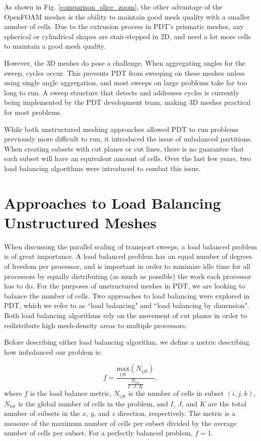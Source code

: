 \documentclass[11pt, letterpaper,titlepage,oneside]{article}
\begin{document}
As shown in Fig. \ref{comparison_slice_zoom}, the other advantage of the OpenFOAM meshes is the ability to maintain good mesh quality with a smaller number of cells. Due to the extrusion process in PDT's prismatic meshes, any spherical or cylindrical shapes are stair-stepped in 2D, and need a lot more cells to maintain a good mesh quality.

However, the 3D meshes do pose a challenge. When aggregating angles for the sweep, cycles occur. This prevents PDT from sweeping on these meshes unless using single angle aggregation, and most sweeps on large problems take far too long to run. A sweep structure that detects and addresses cycles is currently being implemented by the PDT development team, making 3D meshes practical for most problems.

While both unstructured meshing approaches allowed PDT to run problems previously more difficult to run, it introduced the issue of unbalanced partitions. When creating subsets with cut planes or cut lines, there is no guarantee that each subset will have an equivalent amount of cells. Over the last few years, two load balancing algorithms were introduced to combat this issue.

\section{Approaches to Load Balancing Unstructured Meshes}

When discussing the parallel scaling of transport sweeps, a load balanced problem is of great importance. A load balanced problem has an equal number of degrees of freedom per processor, and is important in order to minimize idle time for all processors by equally distributing (as much as possible) the work each processor has to do.  For the purposes of unstructured meshes in PDT, we are looking to balance the number of cells. Two approaches to load balancing were explored in PDT, which we refer to as ``load balancing" and ``load balancing by dimension". 
Both load balancing algorithms rely on the movement of cut planes in order to redistribute high mesh-density areas to multiple processors.

Before describing either load balancing algorithm, we define a metric describing how imbalanced our problem is:

\begin{equation}
f =\frac{\underset{ijk}{\text{max}}(N_{ijk})}{\frac{N_{tot}}{I\cdot J\cdot K}},
\label{metric_def}
\end{equation}
where $f$ is the load balance metric, $N_{ijk}$ is the number of cells in subset $(i,j,k)$, $N_{tot}$ is the global number of cells in the problem, and $I$, $J$, and $K$ are the total number of subsets in the $x$, $y$, and $z$ direction, respectively. The metric is a measure of the maximum number of cells per subset divided by the average number of cells per subset. For a perfectly balanced problem, $f = 1$.
\end{document}
